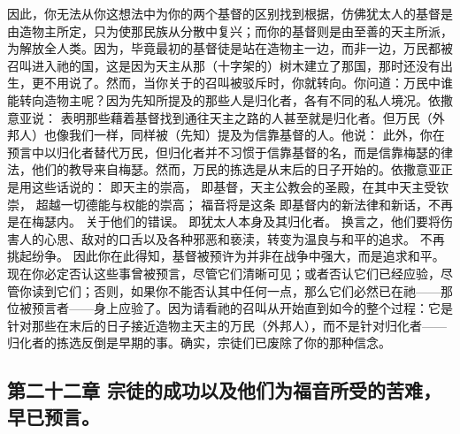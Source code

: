 因此，你无法从你这想法中为你的两个基督的区别找到根据，仿佛犹太人的基督是由造物主所定，只为使那民族从分散中复兴；而你的基督则是由至善的天主所派，为解放全人类。因为，毕竟最初的基督徒是站在造物主一边，而非一边，万民都被召叫进入祂的国，这是因为天主从那（十字架的）树木建立了那国，那时还没有出生，更不用说了。然而，当你关于的召叫被驳斥时，你就转向。你问道：万民中谁能转向造物主呢？因为先知所提及的那些人是归化者，各有不同的私人境况。依撒意亚说： 表明那些藉着基督找到通往天主之路的人甚至就是归化者。但万民（外邦人）也像我们一样，同样被（先知）提及为信靠基督的人。他说： 此外，你在预言中以归化者替代万民，但归化者并不习惯于信靠基督的名，而是信靠梅瑟的律法，他们的教导来自梅瑟。然而，万民的拣选是从末后的日子开始的。依撒意亚正是用这些话说的： 即天主的崇高， 即基督，天主公教会的圣殿，在其中天主受钦崇， 超越一切德能与权能的崇高；  福音将是这条 即基督内的新法律和新话，不再是在梅瑟内。 关于他们的错误。 即犹太人本身及其归化者。 换言之，他们要将伤害人的心思、敌对的口舌以及各种邪恶和亵渎，转变为温良与和平的追求。 不再挑起纷争。  因此你在此得知，基督被预许为并非在战争中强大，而是追求和平。现在你必定否认这些事曾被预言，尽管它们清晰可见；或者否认它们已经应验，尽管你读到它们；否则，如果你不能否认其中任何一点，那么它们必然已在祂——那位被预言者——身上应验了。因为请看祂的召叫从开始直到如今的整个过程：它是针对那些在末后的日子接近造物主天主的万民（外邦人），而不是针对归化者——归化者的拣选反倒是早期的事。确实，宗徒们已废除了你的那种信念。\par


\subsection{第二十二章 宗徒的成功以及他们为福音所受的苦难，早已预言。}

